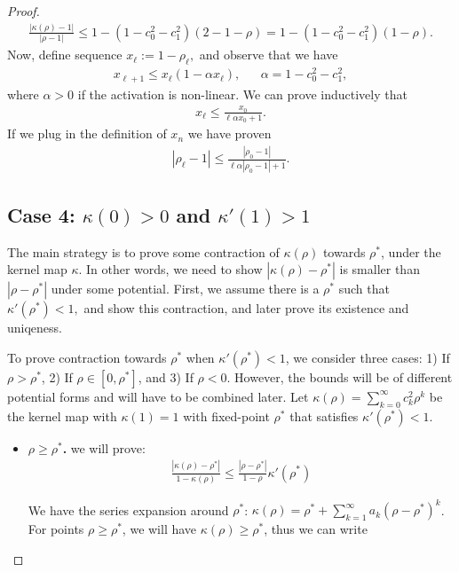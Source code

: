 \begin{proof}
\begin{align*}
    \frac{|\kappa(\rho)-1|}{|\rho-1|} \le 1-(1-c_0^2-c_1^2)(2-1-\rho) = 1- (1-c_0^2-c_1^2) (1-\rho).
\end{align*}
Now, define sequence $x_\ell:= 1-\rho_\ell,$ and observe that we have 
\begin{align*}
    x_{\ell+1} \le x_\ell (1-\alpha x_\ell), && \alpha = 1-c_0^2-c_1^2,
\end{align*}
where $\alpha > 0$ if the activation is non-linear. 
We can prove inductively that 
\begin{align*}
x_\ell\le \frac{x_0}{\ell\alpha x_0 + 1}.
\end{align*}
If we plug in the definition of $x_n$ we have proven
\begin{align*}
|\rho_\ell-1| \le \frac{|\rho_0-1|}{\ell \alpha |\rho_0-1| + 1}.
\end{align*}

\subsection*{Case 4: $\kappa(0)>0$ and $\kappa'(1)>1$}
The main strategy is to prove some contraction of $\kappa(\rho)$ towards $\rho^*$, under the kernel map $\kappa$. In other words, we need to show $|\kappa(\rho)-\rho^*|$ is smaller than $|\rho-\rho^*|$ under some potential. First, we assume there is a $\rho^*$ such that $\kappa'(\rho^*)<1,$ and show this contraction, and later prove its existence and uniqeness. 

To prove contraction towards $\rho^*$ when $\kappa'(\rho^*)<1$, we consider three cases: 1) If $\rho > \rho^*$, 2) If $\rho \in [0,\rho^*]$, and 3) If $\rho < 0$. However, the bounds will be of different potential forms and will have to be combined later.  Let $\kappa(\rho) = \sum_{k=0}^\infty c_k^2 \rho^k$ be the kernel map with $\kappa(1)= 1$ with fixed-point $\rho^*$ that satisfies $\kappa'(\rho^*)<1.$

\begin{itemize}
\item \textbf{$\rho\ge \rho^*$.} we will prove:
\begin{align*}
\frac{|\kappa(\rho)-\rho^*|}{1-\kappa(\rho)} \le \frac{|\rho-\rho^*|}{1-\rho} \kappa'(\rho^*)
\end{align*}

We have the series expansion around $\rho^*$: $\kappa(\rho) = \rho^* + \sum_{k=1}^\infty a_k (\rho-\rho^*)^k$. For points $\rho\ge \rho^*$, we will have $\kappa(\rho)\ge \rho^*$, thus we can write


\end{itemize}
\end{proof}
